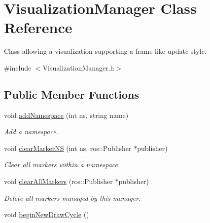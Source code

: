 \hypertarget{classVisualizationManager}{\section{Visualization\-Manager Class Reference}
\label{classVisualizationManager}
}


Class allowing a visualization supporting a frame like update style.  




{\ttfamily \#include $<$Visualization\-Manager.\-h$>$}

\subsection*{Public Member Functions}
\begin{DoxyCompactItemize}
\item 
void \hyperlink{classVisualizationManager_ac0c108a709de3c89db8c43707dd2220a}{add\-Namespace} (int ns, string name)
\begin{DoxyCompactList}\small\item\em Add a namespace. \end{DoxyCompactList}\item 
void \hyperlink{classVisualizationManager_abc61da41f78114714fa3c58de96d66eb}{clear\-Marker\-N\-S} (int ns, ros\-::\-Publisher $\ast$publisher)
\begin{DoxyCompactList}\small\item\em Clear all markers within a namespace. \end{DoxyCompactList}\item 
void \hyperlink{classVisualizationManager_a8d712fe1e6c7743100a1ba7fa019a781}{clear\-All\-Markers} (ros\-::\-Publisher $\ast$publisher)
\begin{DoxyCompactList}\small\item\em Delete all markers managed by this manager. \end{DoxyCompactList}\item 
\hypertarget{classVisualizationManager_a831e69c1d56167c0d02ab4841d6d7bc5}{void \hyperlink{classVisualizationManager_a831e69c1d56167c0d02ab4841d6d7bc5}{begin\-New\-Draw\-Cycle} ()}\label{classVisualizationManager_a831e69c1d56167c0d02ab4841d6d7bc5}


\end{DoxyCompactItemize}
